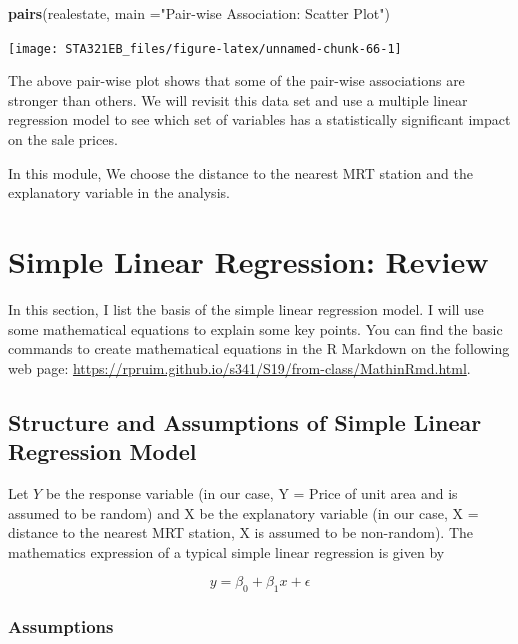 \documentclass[
]{book}
\newenvironment{Shaded}{\begin{snugshade}}{\end{snugshade}}
\newcommand{\AttributeTok}[1]{\textcolor[rgb]{0.13,0.29,0.53}{#1}}
\newcommand{\FunctionTok}[1]{\textcolor[rgb]{0.13,0.29,0.53}{\textbf{#1}}}
\newcommand{\NormalTok}[1]{#1}
\newcommand{\StringTok}[1]{\textcolor[rgb]{0.31,0.60,0.02}{#1}}
\begin{document}
\begin{Shaded}
\begin{Highlighting}[]
\FunctionTok{pairs}\NormalTok{(realestate, }\AttributeTok{main =}\StringTok{"Pair{-}wise Association: Scatter Plot"}\NormalTok{)}
\end{Highlighting}
\end{Shaded}

\begin{center}\texttt{[image: STA321EB\_files/figure-latex/unnamed-chunk-66-1]} \end{center}

The above pair-wise plot shows that some of the pair-wise associations are stronger than others. We will revisit this data set and use a multiple linear regression model to see which set of variables has a statistically significant impact on the sale prices.

In this module, We choose the distance to the nearest MRT station and the explanatory variable in the analysis.

\hypertarget{simple-linear-regression-review}{%
\section{Simple Linear Regression: Review}\label{simple-linear-regression-review}}

In this section, I list the basis of the simple linear regression model. I will use some mathematical equations to explain some key points. You can find the basic commands to create mathematical equations in the R Markdown on the following web page: \url{https://rpruim.github.io/s341/S19/from-class/MathinRmd.html}.

\hypertarget{structure-and-assumptions-of-simple-linear-regression-model}{%
\subsection{Structure and Assumptions of Simple Linear Regression Model}\label{structure-and-assumptions-of-simple-linear-regression-model}}

Let \(Y\) be the response variable (in our case, Y = Price of unit area and is assumed to be random) and X be the explanatory variable (in our case, X = distance to the nearest MRT station, X is assumed to be non-random). The mathematics expression of a typical simple linear regression is given by

\[
y = \beta_0 + \beta_1 x + \epsilon
\]

\hypertarget{assumptions}{%
\subsubsection{Assumptions}\label{assumptions}}
\end{document}
